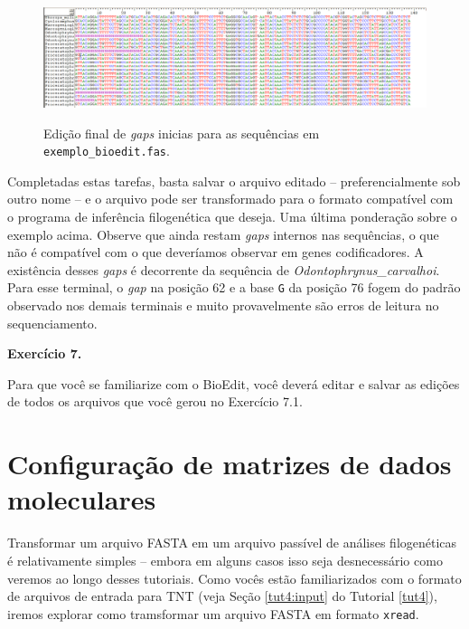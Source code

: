 \begin{refsection}
  \begin{figure}[H]
      {\includegraphics[scale=0.3]{figures/tut7/bioedit_edited.eps}}
	{\caption[Bioedit: Edição final de \textit{gaps} inicias]{Edição final de \textit{gaps} inicias para as sequências em \texttt{exemplo\_bioedit.fas}.}\label{tut7:fig:bioedit_edited}}
  \end{figure}


Completadas estas tarefas, basta salvar o arquivo editado -- preferencialmente sob outro nome -- e o arquivo pode ser transformado para o formato compatível com o programa de inferência filogenética que deseja. Uma última ponderação sobre o exemplo acima. Observe que ainda restam \textit{gaps} internos nas sequências, o que não é compatível com o que deveríamos observar em genes codificadores. A existência desses \textit{gaps} é decorrente da sequência de \textit{Odontophrynus\_carvalhoi}. Para esse terminal, o \textit{gap} na posição 62 e a base \texttt{G} da posição 76 fogem do padrão observado nos demais terminais e muito provavelmente são erros de leitura no sequenciamento.\\

\begin{blackBlock}{\textbf{Exercício 7.}}\label{tut7:ex:ex3}

Para que você se familiarize com o BioEdit, você deverá editar e salvar as edições de todos os arquivos que você gerou no Exercício 7.1.

\end{blackBlock}


\section{Configuração de matrizes de dados moleculares}\label{tut7:matrices}

Transformar um arquivo FASTA em um arquivo passível de análises filogenéticas é relativamente simples -- embora em alguns casos isso seja desnecessário como veremos ao longo desses tutoriais. Como vocês estão familiarizados com o formato de arquivos de entrada para TNT (veja Seção \ref{tut4:input} do Tutorial \ref{tut4}), iremos explorar como tramsformar um arquivo FASTA em formato \texttt{xread}.\\


\end{refsection}
